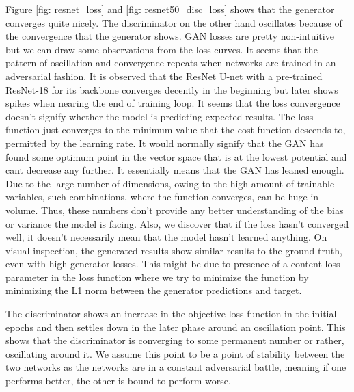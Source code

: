 \documentclass{article} %
\begin{document}
    Figure \ref{fig: resnet_loss} and \ref{fig: resnet50_disc_loss} shows that the generator converges quite nicely. The discriminator on the other hand oscillates because of the convergence that the generator shows. GAN losses are pretty non-intuitive but we can draw some observations from the loss curves. It seems that the pattern of oscillation and convergence repeats when networks are trained in an adversarial fashion. It is observed that the ResNet U-net with a pre-trained ResNet-18 for its backbone converges decently in the beginning but later shows spikes when nearing the end of training loop. It seems that the loss convergence doesn't signify whether the model is predicting expected results. The loss function just converges to the minimum value that the cost function descends to, permitted by the learning rate. It would normally signify that the GAN has found some optimum point in the vector space that is at the lowest potential and cant decrease any further. It essentially means that the GAN has leaned enough. Due to the large number of dimensions, owing to the high amount of trainable variables, such combinations, where the function converges, can be huge in volume. Thus, these numbers don't provide any better understanding of the bias or variance the model is facing. Also, we discover that if the loss hasn't converged well, it doesn't necessarily mean that the model hasn't learned anything. On visual inspection, the generated results show similar results to the ground truth, even with high generator losses. This might be due to presence of a content loss parameter in the loss function where we try to minimize the function by  minimizing the L1 norm between the generator predictions and target.
    
    The discriminator shows an increase in the objective loss function in the initial epochs and then settles down in the later phase around an oscillation point. This shows that the discriminator is converging to some permanent number or rather, oscillating around it. We assume this point to be a point of stability between the two networks as the networks are in a constant adversarial battle, meaning if one performs better, the other is bound to perform worse.
\end{document}
